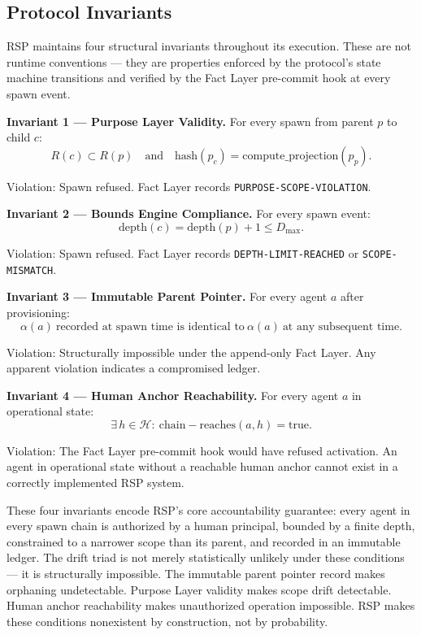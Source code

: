 \subsection{Protocol Invariants}

RSP maintains four structural invariants throughout its execution. These are not runtime conventions — they are properties enforced by the protocol's state machine transitions and verified by the Fact Layer pre-commit hook at every spawn event.

\bigskip
\noindent\textbf{Invariant 1 — Purpose Layer Validity.} For every spawn from parent $p$ to child $c$:
\begin{equation}
R(c) \subset R(p)\quad \text{and} \quad \mathrm{hash}(p_c) = \mathrm{compute\_projection}(p_p).
\label{eq:rs-inv-purpose-validity}
\end{equation}

Violation: Spawn refused. Fact Layer records \texttt{PURPOSE-SCOPE-VIOLATION}.

\bigskip
\noindent\textbf{Invariant 2 — Bounds Engine Compliance.} For every spawn event:
\begin{equation}
\mathrm{depth}(c) = \mathrm{depth}(p) + 1 \leq D_{\max}.
\label{eq:rs-inv-bounds-compliance}
\end{equation}

Violation: Spawn refused. Fact Layer records \texttt{DEPTH-LIMIT-REACHED} or \texttt{SCOPE-MISMATCH}.

\bigskip
\noindent\textbf{Invariant 3 — Immutable Parent Pointer.} For every agent $a$ after provisioning:
\begin{equation}
\alpha(a)\ \text{recorded at spawn time is identical to}\ \alpha(a)\ \text{at any subsequent time}.
\label{eq:rs-inv-immutable-parent}
\end{equation}

Violation: Structurally impossible under the append-only Fact Layer. Any apparent violation indicates a compromised ledger.

\bigskip
\noindent\textbf{Invariant 4 — Human Anchor Reachability.} For every agent $a$ in operational state:
\begin{equation}
\exists\, h \in \mathcal{H}:\ \mathrm{chain-reaches}(a, h) = \mathrm{true}.
\label{eq:rs-inv-human-anchor}
\end{equation}

Violation: The Fact Layer pre-commit hook would have refused activation. An agent in operational state without a reachable human anchor cannot exist in a correctly implemented RSP system.

\bigskip
These four invariants encode RSP's core accountability guarantee: every agent in every spawn chain is authorized by a human principal, bounded by a finite depth, constrained to a narrower scope than its parent, and recorded in an immutable ledger. The drift triad is not merely statistically unlikely under these conditions — it is structurally impossible. The immutable parent pointer record makes orphaning undetectable. Purpose Layer validity makes scope drift detectable. Human anchor reachability makes unauthorized operation impossible. RSP makes these conditions nonexistent by construction, not by probability.